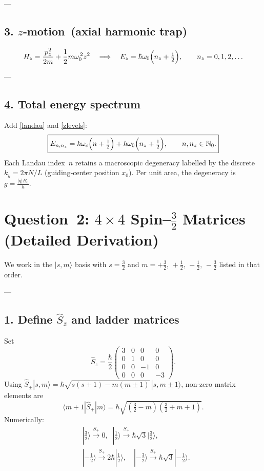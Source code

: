 \documentclass[12pt]{article}
\begin{document}
---
\subsection*{3.  $z$‐motion \,(axial harmonic trap)}
\begin{equation}
 H_z = \frac{p_z^{2}}{2m}+\frac12 m\omega_0^{\,2}z^{2}
 \quad\Longrightarrow\quad
 E_z = \hbar\omega_0\Bigl(n_z+\tfrac12\Bigr),\qquad n_z=0,1,2,\dots
\label{zlevels}
\end{equation}

---
\subsection*{4.  Total energy spectrum}
Add \eqref{landau} and \eqref{zlevels}:
\begin{equation}
\boxed{\rule{0pt}{12pt}
 E_{n,n_z}=\hbar\omega_c\Bigl(n+\tfrac12\Bigr)+\hbar\omega_0\Bigl(n_z+\tfrac12\Bigr),
 \qquad n,n_z\in\mathbb N_0.}
\end{equation}
Each Landau index~$n$ retains a macroscopic degeneracy labelled by the discrete
\(k_y=2\pi N/L\) (guiding‑center position $x_0$).  Per unit area, the degeneracy is
\(g=\tfrac{|q|B_0}{h}\).

\bigskip






\section*{Question 2: $4\!\times\!4$ Spin--$\tfrac32$ Matrices (Detailed Derivation)}

We work in the $|s,m\rangle$ basis with $s=\tfrac32$ and
\(m=+\tfrac32,\,+\tfrac12,\,-\tfrac12,\,-\tfrac32\) listed in that order.

---
\subsection*{1.  Define $\hat S_z$ and ladder matrices}
Set
\[
  \hat S_z=\frac{\hbar}{2}
  \begin{pmatrix}
    3&0&0&0\\ 0&1&0&0\\ 0&0&-1&0\\0&0&0&-3
  \end{pmatrix}.
\]
Using
\( \hat S_\pm|s,m\rangle = \hbar\sqrt{s(s+1)-m(m\pm1)}\,|s,m\pm1\rangle\),
non‑zero matrix elements are
\[
  \langle m+1|\hat S_+|m\rangle  = \hbar\sqrt{(\tfrac32-m)(\tfrac32+m+1)}.
\]
Numerically:
\begin{align*}
  &|{\tfrac32}\rangle\xrightarrow{S_+}0,\;\;|{\tfrac12}\rangle\xrightarrow{S_+}\hbar\sqrt3|{\tfrac32}\rangle,\\[2pt]
  &|{-\tfrac12}\rangle\xrightarrow{S_+}2\hbar|{\tfrac12}\rangle,\quad
  |{-\tfrac32}\rangle\xrightarrow{S_+}\hbar\sqrt3|{-\tfrac12}\rangle.
\end{align*}
\end{document}

